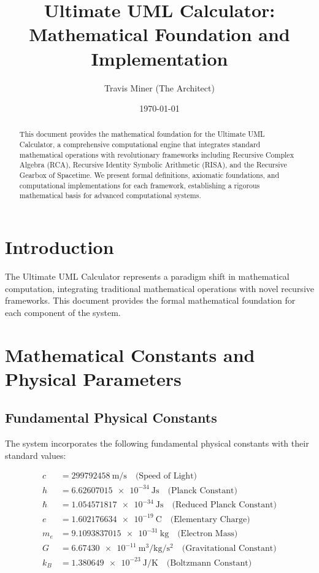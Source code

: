 \documentclass[12pt,a4paper]{article}
\title{Ultimate UML Calculator: Mathematical Foundation and Implementation}
\author{Travis Miner (The Architect)}
\date{\today}
\begin{document}
\maketitle

\begin{abstract}
This document provides the mathematical foundation for the Ultimate UML Calculator, a comprehensive computational engine that integrates standard mathematical operations with revolutionary frameworks including Recursive Complex Algebra (RCA), Recursive Identity Symbolic Arithmetic (RISA), and the Recursive Gearbox of Spacetime. We present formal definitions, axiomatic foundations, and computational implementations for each framework, establishing a rigorous mathematical basis for advanced computational systems.
\end{abstract}

\tableofcontents
\newpage

\section{Introduction}

The Ultimate UML Calculator represents a paradigm shift in mathematical computation, integrating traditional mathematical operations with novel recursive frameworks. This document provides the formal mathematical foundation for each component of the system.

\section{Mathematical Constants and Physical Parameters}

\subsection{Fundamental Physical Constants}

The system incorporates the following fundamental physical constants with their standard values:

\begin{align}
c &= \SI{299792458}{\meter\per\second} \quad \text{(Speed of Light)} \\
h &= \SI{6.62607015e-34}{\joule\second} \quad \text{(Planck Constant)} \\
\hbar &= \SI{1.054571817e-34}{\joule\second} \quad \text{(Reduced Planck Constant)} \\
e &= \SI{1.602176634e-19}{\coulomb} \quad \text{(Elementary Charge)} \\
m_e &= \SI{9.1093837015e-31}{\kilogram} \quad \text{(Electron Mass)} \\
G &= \SI{6.67430e-11}{\meter\cubed\per\kilogram\per\second\squared} \quad \text{(Gravitational Constant)} \\
k_B &= \SI{1.380649e-23}{\joule\per\kelvin} \quad \text{(Boltzmann Constant)}
\end{align}
\end{document}
